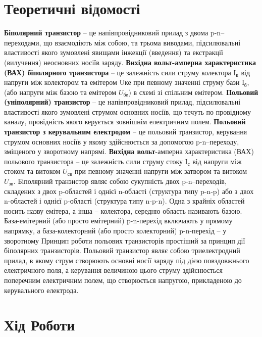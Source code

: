 \documentclass[
  ukrainian,
  14pt
]{extreport}
\begin{document}
\section{Теоретичні відомості}
\textbf{Біполярний транзистор} – це напівпровідниковий прилад з двома p-n–переходами, що взаємодіють між собою, та трьома виводами,
підсилювальні властивості якого зумовлені явищами інжекції (введення) та
екстракції (вилучення) неосновних носіїв заряду.
\textbf{Вихідна вольт-амперна характеристика (ВАХ) біполярного
транзистора} – це залежність сили струму колектора $І_{\text{к}}$ від напруги між
колектором та емітером Uке при певному значенні струму бази $І_{\text{б}}$, (або
напруги між базою та емітером $U_{\text{бе}}$) в схемі зі спільним емітером.
\textbf{Польовий (уніполярний) транзистор} – це напівпровідниковий прилад,
підсилювальні властивості якого зумовлені струмом основних носіїв, що
течуть по провідному каналу, провідність якого керується зовнішнім
електричним полем.
\textbf{Польовий транзистор з керувальним електродом} – це польовий
транзистор, керування струмом основних носіїв у якому здійснюється за
допомогою p-n–переходу, зміщеного у зворотному напрямі.
\textbf{Вихідна вольт}-амперна характеристика (ВАХ) польового
транзистора – це залежність сили струму стоку $І_{\text{с}}$ від напруги між стоком
та витоком $U_{\text{св}}$ при певному значенні напруги між затвором та витоком
$U_{\text{зв}}$.
Біполярний транзистор являє собою сукупність двох p-n–переходів,
складених з двох p-областей і однієї n-області (структура типу p-n-p) або з
двох n-областей і однієї p-області (структура типу n-p-n). Одна з крайніх
областей носить назву емітера, а інша – колектора, середню область
називають базою. База-емітерний (або просто емітерний) p-n-перехід
включають у прямому напрямку, а база-колекторний (або просто
колекторний) p-n-перехід – у зворотному
Принцип роботи польових транзисторів простіший за принцип дії
біполярних транзисторів. Польовий транзистор являє собою
триелектродний прилад, в якому струм створюють основні носії заряду під
дією повздовжнього електричного поля, а керування величиною цього
струму здійснюється поперечним електричним полем, що створюється
напругою, прикладеною до керувального електрода.

\section{Хід Роботи}
\end{document}

